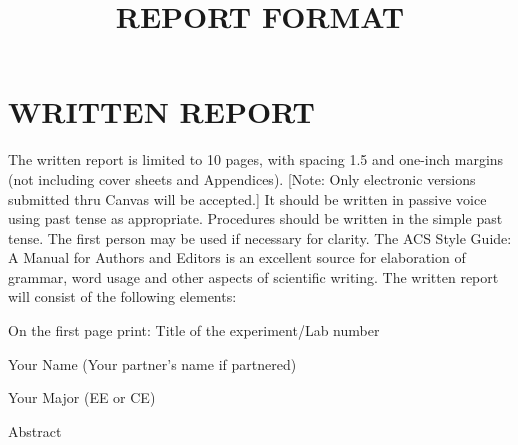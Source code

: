 \documentclass[12pt]{article}
\begin{document}
\title{REPORT FORMAT}
\author{}
\date{}
\maketitle

\section{WRITTEN REPORT}
The written report is limited to 10 pages, with spacing 1.5 and one-inch margins (not including cover sheets and Appendices). [Note: Only electronic versions submitted thru Canvas will be accepted.] It should be written in passive voice using past tense as appropriate. Procedures should be written in the simple past tense. The first person may be used if necessary for clarity. The ACS Style Guide: A Manual for Authors and Editors is an excellent source for elaboration of grammar, word usage and other aspects of scientific writing. The written report will consist of the following elements:

On the first page print: \quad Title of the experiment/Lab number

Your Name (Your partner's name if partnered) 

Your Major (EE or CE)

Abstract
\end{document}
